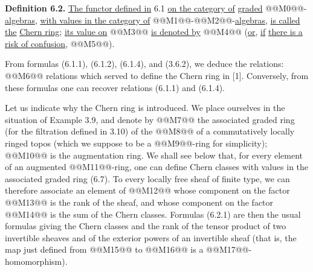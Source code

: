 \textbf{Definition 6.2.} \uline{The functor defined in} 6.1 \uline{on the category of} \uline{graded} @@M0@@-\uline{algebras}, \uline{with values in the category of} @@M1@@-@@M2@@-\uline{algebras}, \uline{is called the} \uline{Chern ring}; \uline{its value on} @@M3@@ \uline{is denoted by} @@M4@@ (\uline{or}, \uline{if} \uline{there is a risk of confusion}, @@M5@@).

From formulas (6.1.1), (6.1.2), (6.1.4), and (3.6.2), we deduce the relations:
@@M6@@
relations which served to define the Chern ring in [1]. Conversely, from these formulas one can recover relations (6.1.1) and (6.1.4).

Let us indicate why the Chern ring is introduced. We place ourselves in the situation of Example 3.9, and denote by @@M7@@ the associated graded ring (for the filtration defined in 3.10) of the @@M8@@ of a commutatively locally ringed topos (which we suppose to be a @@M9@@-ring for simplicity); @@M10@@ is the augmentation ring. We shall see below that, for every element of an augmented @@M11@@-ring, one can define Chern classes with values in the associated graded ring (6.7). To every locally free sheaf of finite type, we can therefore associate an element of @@M12@@ whose component on the factor @@M13@@ is the rank of the sheaf, and whose component on the factor @@M14@@ is the sum of the Chern classes. Formulas (6.2.1) are then the usual formulas giving the Chern classes and the rank of the tensor product of two invertible sheaves and of the exterior powers of an invertible sheaf (that is, the map just defined from @@M15@@ to @@M16@@ is a @@M17@@-homomorphism).

